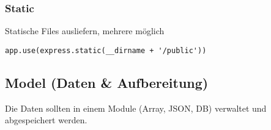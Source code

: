 
\subsubsection{Static}
Statische Files ausliefern, mehrere möglich
\begin{lstlisting}
app.use(express.static(__dirname + '/public'))
\end{lstlisting}




\subsection{Model (Daten \& Aufbereitung)}
Die Daten sollten in einem Module (Array, JSON, DB) verwaltet und abgespeichert werden.

